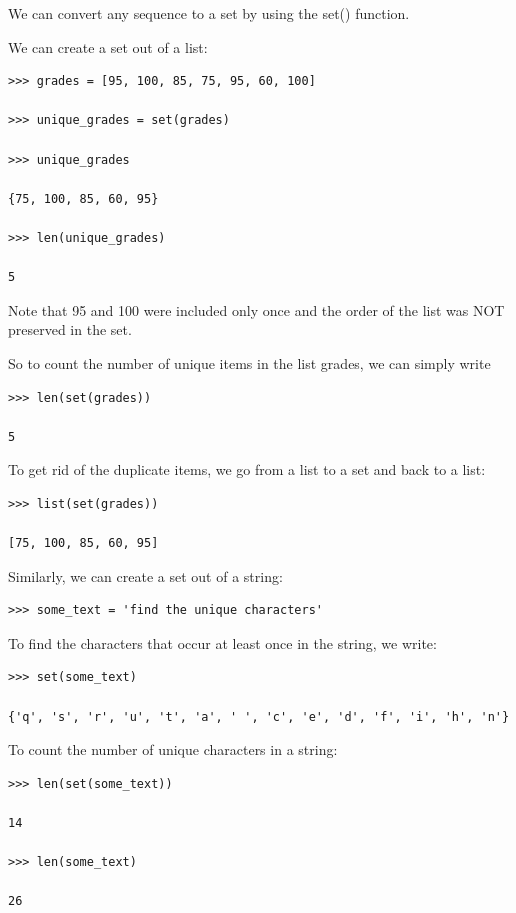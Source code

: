 \documentclass{article}
\begin{document}
We can convert any sequence to a set by using the set() function.

We can create a set out of a list:

\begin{lstlisting}
>>> grades = [95, 100, 85, 75, 95, 60, 100]

>>> unique_grades = set(grades)

>>> unique_grades

{75, 100, 85, 60, 95}

>>> len(unique_grades)

5
\end{lstlisting}

Note that 95 and 100 were included only once and the order of the list was NOT preserved in the set.

So to count the number of unique items in the list grades, we can simply write

\begin{lstlisting}
>>> len(set(grades))

5 
\end{lstlisting}

To get rid of the duplicate items, we go from a list to a set and back to a list:

\begin{lstlisting}
>>> list(set(grades))

[75, 100, 85, 60, 95]
\end{lstlisting}

Similarly, we can create a set out of a string:

\begin{lstlisting}
>>> some_text = 'find the unique characters'
\end{lstlisting}

To find the characters that occur at least once in the string, we write:

\begin{lstlisting}
>>> set(some_text)

{'q', 's', 'r', 'u', 't', 'a', ' ', 'c', 'e', 'd', 'f', 'i', 'h', 'n'}
\end{lstlisting}

To count the number of unique characters in a string:

\begin{lstlisting}
>>> len(set(some_text))

14

>>> len(some_text)

26
\end{lstlisting}
\end{document}

